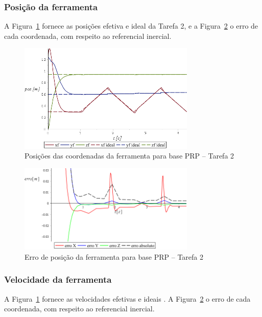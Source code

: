 \subsubsection{Posição da ferramenta}

A Figura~\ref{fig::t2_posf_base_prp} fornece as posições efetiva e ideal da
Tarefa 2, e a Figura~\ref{fig::t2_erroposf_base_prp} o erro de cada
coordenada, com respeito ao referencial inercial.

\begin{figure}[h!]
	\centering 
 	\includegraphics[width=0.75\textwidth]{figs/t2_posf_base_prp}
 	\caption{Posições das coordenadas da ferramenta para base PRP -- Tarefa
 	2}
 	\label{fig::t2_posf_base_prp}
\end{figure}

\begin{figure}[h!]
	\centering 
 	\includegraphics[width=0.75\textwidth]{figs/t2_erroposf_base_prp}
 	\caption{Erro de posição da ferramenta para base PRP -- Tarefa 2}
 	\label{fig::t2_erroposf_base_prp}
\end{figure}


\subsubsection{Velocidade da ferramenta}

A Figura~\ref{fig::t2_posf_base_prp} fornece as velocidades
efetivas e ideais . A Figura~\ref{fig::t2_erroposf_base_prp} o erro de cada
coordenada, com respeito ao referencial inercial.

